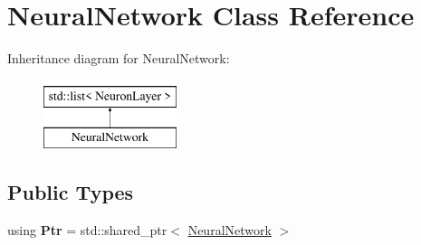 \hypertarget{classNeuralNetwork}{}\section{Neural\+Network Class Reference}
\label{classNeuralNetwork}
Inheritance diagram for Neural\+Network\+:\begin{figure}[H]
\begin{center}
\leavevmode
\includegraphics[height=2.000000cm]{classNeuralNetwork}
\end{center}
\end{figure}
\subsection*{Public Types}
\begin{DoxyCompactItemize}
\item 
\mbox{\label{classNeuralNetwork_a31de381df65f261fd0f38e0559995d1a}} 
using {\bfseries Ptr} = std\+::shared\+\_\+ptr$<$ \hyperlink{classNeuralNetwork}{Neural\+Network} $>$
\end{DoxyCompactItemize}
